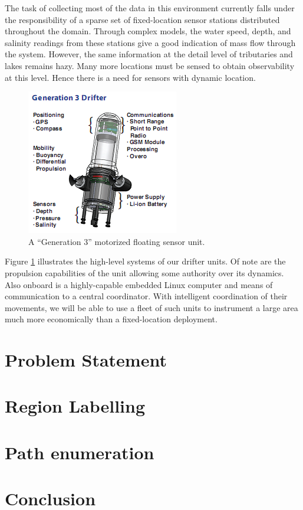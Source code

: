 \documentclass[11pt,letter]{article}
\begin{document}
The task of collecting most of the data in this environment currently falls under the responsibility of a sparse set of fixed-location sensor stations distributed throughout the domain.  Through complex models, the water speed, depth, and salinity readings from these stations give a good indication of mass flow through the system. However, the same information at the detail level of tributaries and lakes remains hazy. Many more locations must be sensed to obtain observability at this level. Hence there is a need for sensors with dynamic location.

\begin{figure}[ht]
\centering 
\includegraphics[width=0.5\linewidth,trim=0 0 0 20px,clip=true]{figures/drifter.png}
\caption{A ``Generation 3'' motorized floating sensor unit.\label{fig:gen3}}
\end{figure}

Figure \ref{fig:gen3} illustrates the high-level systems of our drifter units. Of note are the propulsion capabilities of the unit allowing some authority over its dynamics.  Also onboard is a highly-capable embedded Linux computer and means of communication to a central coordinator.  With intelligent coordination of their movements, we will be able to use a fleet of such units to instrument a large area much more economically than a fixed-location deployment.

\section{Problem Statement}


\section{Region Labelling}
\cite{floodfill}

\section{Path enumeration}

\section{}

\section{Conclusion}




\end{document}
